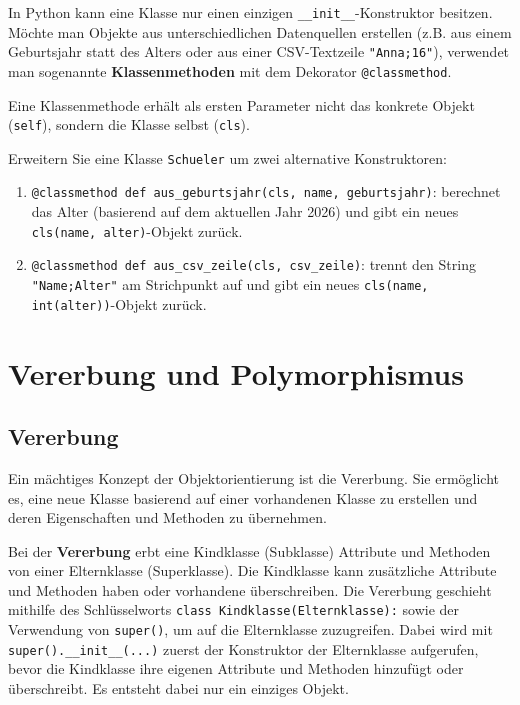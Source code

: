 \begin{mychallenge}
In Python kann eine Klasse nur einen einzigen \lstinline|__init__|-Konstruktor besitzen. Möchte man Objekte aus unterschiedlichen Datenquellen erstellen (z.B. aus einem Geburtsjahr statt des Alters oder aus einer CSV-Textzeile \lstinline|"Anna;16"|), verwendet man sogenannte \textbf{Klassenmethoden} mit dem Dekorator \lstinline|@classmethod|.

Eine Klassenmethode erhält als ersten Parameter nicht das konkrete Objekt (\lstinline|self|), sondern die Klasse selbst (\lstinline|cls|).

Erweitern Sie eine Klasse \lstinline|Schueler| um zwei alternative Konstruktoren:
\begin{enumerate}
    \item \lstinline|@classmethod def aus_geburtsjahr(cls, name, geburtsjahr)|: berechnet das Alter (basierend auf dem aktuellen Jahr 2026) und gibt ein neues \lstinline|cls(name, alter)|-Objekt zurück.
    \item \lstinline|@classmethod def aus_csv_zeile(cls, csv_zeile)|: trennt den String \lstinline|"Name;Alter"| am Strichpunkt auf und gibt ein neues \lstinline|cls(name, int(alter))|-Objekt zurück.
\end{enumerate}

\begin{myanswer}

\end{myanswer}
\end{mychallenge}

\section{Vererbung und Polymorphismus}
\subsection{Vererbung}

Ein mächtiges Konzept der Objektorientierung ist die Vererbung. Sie ermöglicht es, eine neue Klasse basierend auf einer vorhandenen Klasse zu erstellen und deren Eigenschaften und Methoden zu übernehmen.

\begin{mydefinition}
Bei der \textbf{Vererbung} erbt eine Kindklasse (Subklasse) Attribute und Methoden von einer Elternklasse (Superklasse). Die Kindklasse kann zusätzliche Attribute und Methoden haben oder vorhandene überschreiben. Die Vererbung geschieht mithilfe des Schlüsselworts \lstinline|class Kindklasse(Elternklasse):| sowie der Verwendung von \lstinline|super()|, um auf die Elternklasse zuzugreifen. Dabei wird mit \lstinline|super().__init__(...)| zuerst der Konstruktor der Elternklasse aufgerufen, bevor die Kindklasse ihre eigenen Attribute und Methoden hinzufügt oder überschreibt. Es entsteht dabei nur ein einziges Objekt.
\end{mydefinition}

